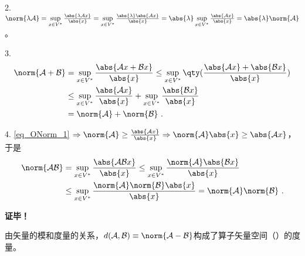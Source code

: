 2.$\norm{\lambda\mathcal A}=\sup\limits_{x\in{V^*}}\frac{\abs{\lambda \mathcal Ax}}{\abs{x}}=\sup\limits_{x\in{V^*}}\frac{\abs{\lambda}\abs{ \mathcal Ax}}{\abs{x}}=\abs{\lambda}\sup\limits_{x\in{V^*}}\frac{\abs{\mathcal Ax}}{\abs{x}}=\abs{\lambda}\norm{\mathcal A}
$。

3.\begin{equation}
\begin{aligned}
\norm{\mathcal A+\mathcal B}&=\sup\limits_{x\in{V^*}}\frac{\abs{\mathcal Ax+\mathcal B x}}{\abs{x}}\leq\sup\limits_{x\in{V^*}}\qty(\frac{\abs{\mathcal Ax}+\abs{\mathcal B x}}{\abs{x}})\\
&\leq \sup\limits_{x\in{V^*}}\frac{\abs{ \mathcal Ax}}{\abs{x}}+\sup\limits_{x\in{V^*}}\frac{\abs{\mathcal B x}}{\abs{x}}\\
&=\norm{\mathcal A}+\norm{\mathcal B}~.
\end{aligned}
\end{equation}

4. \autoref{eq_ONorm_1} $\Rightarrow\norm{\mathcal A}\geq\frac{\abs{\mathcal Ax}}{\abs{x}}\Rightarrow \norm{\mathcal A}\abs{x}\geq\abs{\mathcal A x}$，于是
\begin{equation}
\begin{aligned}
\norm{\mathcal{AB}}&=\sup\limits_{x\in{V^*}}\frac{\abs{\mathcal{AB} x}}{\abs{x}}\leq\sup\limits_{x\in{V^*}}\frac{\norm{\mathcal A}\abs{\mathcal{B} x}}{\abs{x}}\\
&\leq\sup\limits_{x\in{V^*}}\frac{\norm{\mathcal A}\norm{\mathcal B}\abs{x}}{\abs{x}}=\norm{\mathcal A}\norm{\mathcal B}~.
\end{aligned}
\end{equation}

\textbf{证毕！}

由矢量的模和度量的关系，$d(\mathcal A,\mathcal B)\equiv\norm{\mathcal{A-B}}$构成了算子矢量空间（）的度量。

\addTODO{}

